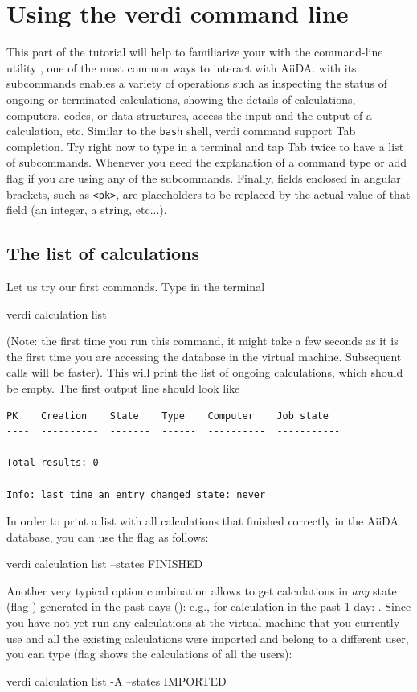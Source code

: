 \section[Verdi command line]{Using the verdi command line}

This part of the tutorial will help to familiarize your with the command-line utility , one of the most common ways to interact with AiiDA.  with its subcommands enables a variety of operations such as inspecting the status of ongoing or terminated calculations, showing the details of calculations, computers, codes, or data structures, access the input and the output of a calculation, etc.  Similar to the \texttt{bash} shell, verdi command support Tab completion. Try right now to type  in a terminal and tap Tab twice to have a list of subcommands. Whenever you need the explanation of a command type  or add  flag if you are using any of the  subcommands. 
Finally, fields enclosed in angular brackets, such as \texttt{<pk>}, are placeholders to be replaced by the actual value of that field (an integer, a string, etc...).

\subsection{The list of calculations}
Let us try our first  commands. Type in the terminal
\begin{bashcommand}
verdi calculation list
\end{bashcommand}
(Note: the first time you run this command, it might take a few seconds as it is the first time you are accessing the database in the virtual machine. Subsequent calls will be faster).
This will print the list of ongoing calculations, which should be empty. The first output line should look like
\begin{verbatim}
PK    Creation    State    Type    Computer    Job state
----  ----------  -------  ------  ----------  -----------

Total results: 0

Info: last time an entry changed state: never
\end{verbatim}

In order to print a list with all calculations that finished correctly in the AiiDA database, you can use the  flag as follows:
\begin{bashcommand}
verdi calculation list --states FINISHED
\end{bashcommand}
Another very typical option combination allows to get calculations in \emph{any} state (flag ) generated in the past  days (): e.g., for calculation in the past 1 day: . Since you have not yet run any calculations at the virtual machine that you currently use and all the existing calculations were imported and belong to a different user, you can type (flag  shows the calculations of all the users):
\begin{bashcommand}
verdi calculation list -A --states IMPORTED
\end{bashcommand}

